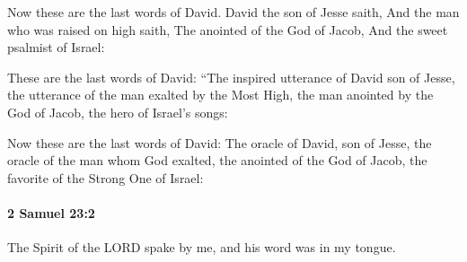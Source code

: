 			\begin{versebox}
					\item[BHS] 
					\item[ASV] Now these are the last words of David. David the son of Jesse saith, And the man who was raised on high saith, The anointed of the God of Jacob, And the sweet psalmist of Israel:
					\item[NIV] These are the last words of David: “The inspired utterance of David son of Jesse, the utterance of the man exalted by the Most High, the man anointed by the God of Jacob, the hero of Israel’s songs:
					\item[NRSV] Now these are the last words of David: The oracle of David, son of Jesse, the oracle of the man whom God exalted, the anointed of the God of Jacob, the favorite of the Strong One of Israel:
			\end{versebox}

		\paragraph{2 Samuel 23:2} %
			\label{2SAMUEL-23-2}

			The Spirit of the LORD spake by me, and his word was in my tongue.

